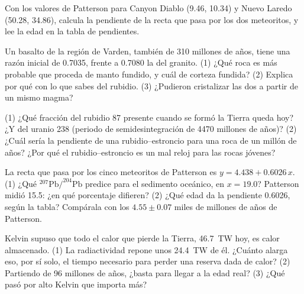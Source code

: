 \begin{exercise}[$\star\star$]\label{exo:g12:age-of-the-earth:11}
Con los valores de Patterson para Canyon Diablo (9.46, 10.34) y Nuevo Laredo
(50.28, 34.86), calcula la pendiente de la recta que pasa por los dos
meteoritos, y lee la edad en la tabla de pendientes.
\end{exercise}

\begin{exercise}[$\star\star\star$]\label{exo:g12:age-of-the-earth:12}
Un basalto de la región de Varden, también de 310 millones de años, tiene una
razón inicial de 0.7035, frente a 0.7080 la del granito. (1) ¿Qué roca es más
probable que proceda de manto fundido, y cuál de corteza fundida? (2) Explica
por qué con lo que sabes del rubidio. (3) ¿Pudieron cristalizar las dos a
partir de un mismo magma?
\end{exercise}

\begin{exercise}[$\star\star\star$]\label{exo:g12:age-of-the-earth:13}
(1) ¿Qué fracción del rubidio 87 presente cuando se formó la Tierra queda hoy?
¿Y del uranio 238 (periodo de semidesintegración de 4470 millones de años)?
(2) ¿Cuál sería la pendiente de una  rubidio--estroncio para una roca
de un millón de años? ¿Por qué el rubidio--estroncio es un mal reloj para las
rocas jóvenes?
\end{exercise}

\begin{exercise}[$\star\star\star$]\label{exo:g12:age-of-the-earth:14}
La recta que pasa por los cinco meteoritos de Patterson es $y = 4.438 + 0.6026\,x$.
(1) ¿Qué $^{207}\mathrm{Pb}/^{204}\mathrm{Pb}$ predice para el sedimento
oceánico, en $x = 19.0$? Patterson midió 15.5: ¿en qué porcentaje difieren?
(2) ¿Qué edad da la pendiente 0.6026, según la tabla? Compárala con los
$4.55 \pm 0.07$ miles de millones de años de Patterson.
\end{exercise}

\begin{exercise}[$\star\star\star$]\label{exo:g12:age-of-the-earth:15}
Kelvin supuso que todo el calor que pierde la Tierra, \qty{46.7}{TW} hoy, es
calor almacenado. (1) La radiactividad repone unos \qty{24.4}{TW} de él.
¿Cuánto alarga eso, por sí solo, el tiempo necesario para perder una reserva
dada de calor? (2) Partiendo de 96 millones de años, ¿basta para llegar a la
edad real? (3) ¿Qué pasó por alto Kelvin que importa más?
\end{exercise}

